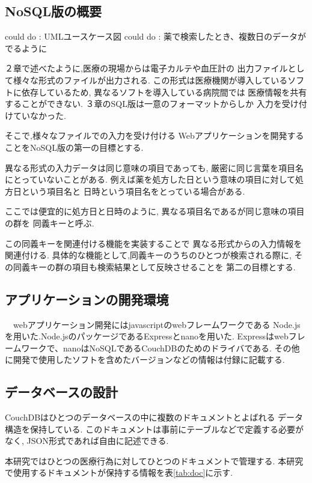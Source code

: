 \subsection{NoSQL版の概要}
	could do : UMLユースケース図
	could do : 薬で検索したとき、複数日のデータがでるように

	２章で述べたように,医療の現場からは電子カルテや血圧計の
	出力ファイルとして様々な形式のファイルが出力される.
	この形式は医療機関が導入しているソフトに依存しているため,
	異なるソフトを導入している病院間では
	医療情報を共有することができない.
	３章のSQL版は一意のフォーマットからしか
	入力を受け付けていなかった.



  そこで,様々なファイルでの入力を受け付ける
  Webアプリケーションを開発することをNoSQL版の第一の目標とする.

  異なる形式の入力データは同じ意味の項目であっても,
  厳密に同じ言葉を項目名にとっていないことがある.
	例えば薬を処方した日という意味の項目に対して処方日という項目名と
	日時という項目名をとっている場合がある.

  ここでは便宜的に処方日と日時のように,
	異なる項目名であるが同じ意味の項目の群を
  同義キーと呼ぶ.

  この同義キーを関連付ける機能を実装することで
	異なる形式からの入力情報を関連付ける.
  具体的な機能として,同義キーのうちのひとつが検索される際に,
  その同義キーの群の項目も検索結果として反映させることを
	第二の目標とする.

\subsection{アプリケーションの開発環境}

　webアプリケーション開発にはjavascriptのwebフレームワークである
	Node.jsを用いた.Node.jsのパッケージであるExpressとnanoを用いた.
	Expressはwebフレームワークで、nanoはNoSQLであるCouchDBのためのドライバである.
	その他に開発で使用したソフトを含めたバージョンなどの情報は付録に記載する.


\subsection{データベースの設計}
	CouchDBはひとつのデータベースの中に複数のドキュメントとよばれる
	データ構造を保持している.
	このドキュメントは事前にテーブルなどで定義する必要がなく,
	JSON形式であれば自由に記述できる.

	本研究ではひとつの医療行為に対してひとつのドキュメントで管理する.
	本研究で使用するドキュメントが保持する情報を表\ref{tab:doc}に示す.

